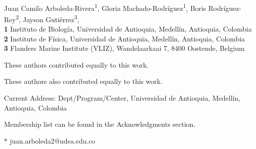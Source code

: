 \documentclass[10pt,letterpaper]{article}
\date{}
\begin{document}
\vspace*{0.2in}

\begin{flushleft}
{\Large
\textbf{}
}
\newline
\\
Juan Camilo Arboleda-Rivera\textsuperscript{1\Yinyang},
Gloria Machado-Rodríguez\textsuperscript{1\Yinyang},
Boris Rodríguez-Rey\textsuperscript{2\textcurrency},
Jayson Gutiérrez\textsuperscript{3},
\\
\bigskip
\textbf{1} Instituto de Biología, Universidad de Antioquia, Medellín,
Antioquia, Colombia
\\
\textbf{2} Instituto de Física, Universidad de Antioquia, Medellín, Antioquia,
Colombia
\\
\textbf{3} Flanders Marine Institute (VLIZ), Wandelaarkaai 7, 8400 Oostende,
Belgium
\\
\bigskip

% 
%
\Yinyang These authors contributed equally to this work.

\ddag These authors also contributed equally to this work.

\textcurrency Current Address: Dept/Program/Center, Universidad de Antioquia, 
Medellín, Antioquia, Colombia %


\textpilcrow Membership list can be found in the Acknowledgments section.

* juan.arboleda2@udea.edu.co

\end{flushleft}
\end{document}
